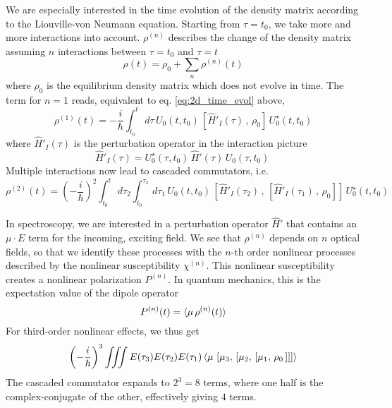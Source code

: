 We are especially interested in the time evolution of the density matrix according to the Liouville-von Neumann equation. Starting from $\tau = t_0$, we take more and more interactions into account. $\rho^{(n)}$ describes the change of the density matrix assuming $n$ interactions between $\tau = t_0$ and $\tau = t$
\begin{equation}
\rho(t) = \rho_0  + \sum_n  \rho^{(n)} (t)
\end{equation}
where $\rho_0$ is the equilibrium density matrix which does not evolve in time.
The term for $n=1$ reads, equivalent to eq.  \ref{eq:2d_time_evol}  above,
\begin{equation}
 \rho^{(1)} (t) = - \frac{i}{\hbar} \int_{t_0}^t \, d\tau \, U_0(t, t_0) \, \left[ \hat{H}'_I(\tau) \, , \, \rho_0 \right] \, U_0^\star (t, t_0)
\end{equation}
where $\hat{H}'_I(\tau) $ is the perturbation operator in the interaction picture
\begin{equation}
\hat{H}'_I(\tau) =  U_0^\star (\tau , t_0) \, \hat{H}'(\tau) \, U_0 (\tau , t_0) \,
\end{equation}
 Multiple interactions now lead to cascaded commutators, i.e.
\begin{equation}
 \rho^{(2)} (t) = \left(- \frac{i}{\hbar}\right)^2   \int_{t_0}^t \, d\tau_2   \int_{t_0}^{\tau_2} \, d\tau_1 \, U_0(t, t_0) \, \left[ \hat{H}'_I(\tau_2) \, , \, \left[ \hat{H}'_I(\tau_1) \, , \, \rho_0 \right] \right] \, U_0^\star (t, t_0)
\end{equation}

In spectroscopy, we are interested in a perturbation operator $\hat{H}'$ that contains an $\mu \cdot E$ term for the incoming, exciting field. We see that $\rho^{(n)}$ depends on $n$ optical fields, so that we identify  these processes with the $n$-th order nonlinear processes described by the nonlinear susceptibility $\chi^{(n)}$. This nonlinear susceptibility creates a nonlinear polarization $P^{(n)}$. In quantum mechanics, this is the expectation value of the dipole operator 
\begin{equation}
P^{(n)} (t) = \braket{ \mu \, \rho^{(n)}(t) }
\end{equation}
For third-order nonlinear effects, we thus get
\begin{equation}
 \left(- \frac{i}{\hbar}\right)^3   \iiint E(\tau_3) E(\tau_2) E(\tau_1)
 \braket{ \mu \, 
  \left[ \mu_3 , \, \left[ \mu_2 , \, \left[ \mu_1 , \, \rho_0 \, \right] \right]  \right] }
  \label{eq:2d-p3-commutator}
\end{equation}
The cascaded commutator expands to $2^3=8$ terms, where one half is the complex-conjugate of the other, effectively giving $4$ terms.

